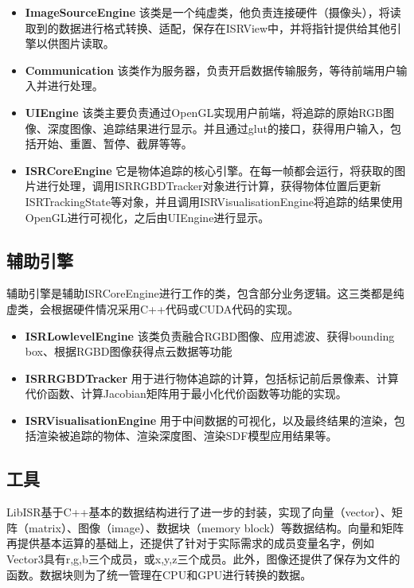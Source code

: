 \begin{itemize}
    \item \textbf{ImageSourceEngine}
该类是一个纯虚类，他负责连接硬件（摄像头），将读取到的数据进行格式转换、适配，保存在ISRView中，并将指针提供给其他引擎以供图片读取。
    
    \item \textbf{Communication}
该类作为服务器，负责开启数据传输服务，等待前端用户输入并进行处理。
    
    \item \textbf{UIEngine}
该类主要负责通过OpenGL实现用户前端，将追踪的原始RGB图像、深度图像、追踪结果进行显示。并且通过glut的接口，获得用户输入，包括开始、重置、暂停、截屏等等。

    \item \textbf{ISRCoreEngine}
它是物体追踪的核心引擎。在每一帧都会运行，将获取的图片进行处理，调用ISRRGBDTracker对象进行计算，获得物体位置后更新ISRTrackingState等对象，并且调用ISRVisualisationEngine将追踪的结果使用OpenGL进行可视化，之后由UIEngine进行显示。

\end{itemize}

\subsection{辅助引擎}

辅助引擎是辅助ISRCoreEngine进行工作的类，包含部分业务逻辑。这三类都是纯虚类，会根据硬件情况采用C++代码或CUDA\cite{CUDARef}代码的实现。

\begin{itemize}
    \item \textbf{ISRLowlevelEngine}
该类负责融合RGBD图像、应用滤波、获得bounding box、根据RGBD图像获得点云数据等功能
    
    \item \textbf{ISRRGBDTracker}
用于进行物体追踪的计算，包括标记前后景像素、计算代价函数、计算Jacobian矩阵用于最小化代价函数等功能的实现。
    
    \item \textbf{ISRVisualisationEngine}
用于中间数据的可视化，以及最终结果的渲染，包括渲染被追踪的物体、渲染深度图、渲染SDF模型应用结果等。
\end{itemize}

\subsection{工具}

LibISR基于C++基本的数据结构进行了进一步的封装，实现了向量（vector）、矩阵（matrix）、图像（image）、数据块（memory block）等数据结构。向量和矩阵再提供基本运算的基础上，还提供了针对于实际需求的成员变量名字，例如Vector3具有r,g,b三个成员，或x,y,z三个成员。此外，图像还提供了保存为文件的函数。数据块则为了统一管理在CPU和GPU进行转换的数据。

